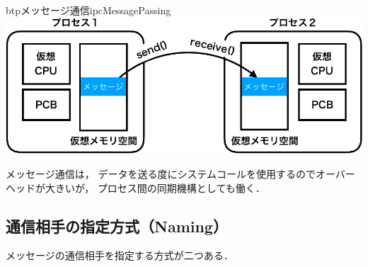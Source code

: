 \begin{myfig}{btp}{メッセージ通信}{ipcMessagePassing}
  \includegraphics[scale=0.6]{Fig/ipcMessagePassing-crop.pdf}
\end{myfig}

メッセージ通信は，
データを送る度にシステムコールを使用するのでオーバーヘッドが大きいが，
プロセス間の同期機構としても働く．

\subsection{通信相手の指定方式（Naming）}
メッセージの通信相手を指定する方式が二つある．


